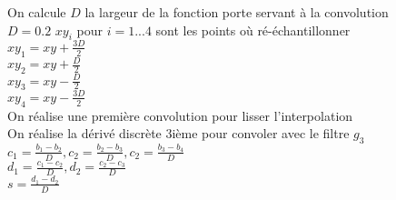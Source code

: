 \documentclass{article}
\begin{document}
  \begin{algorithm}
 \caption{$eval4Integral(img,Img,xy)$}
 \end{algorithm}
 
 \begin{algorithm}
 \caption{$convolImg(img,Img,xy,d)$}
 On calcule $D$ la largeur de la fonction porte servant à la convolution\\
 {
 $D=0.2$
 }
 $xy_{i}$ pour $ i=1...4$ sont les points où ré-échantillonner\\
 $xy_{1}  = xy + \frac{3D}{2}$\\
 $xy_{2}  = xy + \frac{D}{2}$\\
 $xy_{3}  = xy - \frac{D}{2}$\\
 $xy_{4}  = xy - \frac{3D}{2}$\\
 On réalise une première convolution pour lisser l'interpolation\\
 On réalise la dérivé discrète $3$ième pour convoler avec le filtre $g_3$\\
 $c_1 = \frac{b_1 - b_2}{D},c_2=\frac{b_2 - b_3}{D},c_2=\frac{b_3 - b_4}{D}$\\
 $d_1 = \frac{c_1 - c_2}{D},d_2=\frac{c_2 - c_3}{D}$\\
 $s = \frac{d_1 - d_2}{D}$\\
 \end{algorithm}
 
\end{document}
